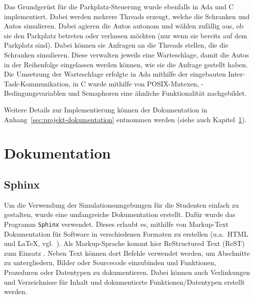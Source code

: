 \documentclass[oneside]{elaboration}
\begin{document}
Das Grundgerüst für die Parkplatz-Steuerung wurde ebenfalls in Ada und C
implementiert. Dabei werden mehrere Threads erzeugt, welche die Schranken und
Autos simulieren. Dabei agieren die Autos autonom und wählen zufällig aus, ob
sie den Parkplatz betreten oder verlassen möchten (nur wenn sie bereits auf dem
Parkplatz sind). Dabei können sie Anfragen an die Threads stellen, die die
Schranken simulieren. Diese verwalten jeweils eine Warteschlage, damit die Autos
in der Reihenfolge eingelassen werden können, wie sie die Anfrage gestellt
haben. Die Umsetzung der Warteschlage erfolgte in Ada mithilfe der eingebauten
Inter-Task-Kommunikation, in C wurde mithilfe von POSIX-Mutexen,
-Bedingungsvariablen und Semaphoren eine ähnliche Funktionalität nachgebildet.

Weitere Details zur Implementierung können der Dokumentation in
Anhang~\ref{sec:projekt-dokumentation} entnommen werden (siehe auch
Kapitel~\ref{sec:dokumentation}).

\section{Dokumentation}
\label{sec:dokumentation}

\subsection{Sphinx}
\label{sec:sphinx}

Um die Verwendung der Simulationsumgebungen für die Studenten einfach zu
gestalten, wurde eine umfangreiche Dokumentation erstellt. Dafür wurde das
Programm \texttt{Sphinx} verwendet. Dieses erlaubt es, mithilfe von Markup-Text
Dokumentation für Software in verschiedenen Formaten zu erstellen (u.a.\ HTML
und LaTeX, vgl.~\cite{Sphinx}). Als Markup-Sprache kommt hier ReStructured Text
(ReST) zum Einsatz \citep[vgl.][]{Sphinx}.
Neben Text können dort Befehle verwendet werden, um Abschnitte zu untergliedern,
Bilder oder Sourcecode einzubinden und Funktionen, Prozeduren oder Datentypen zu
dokumentieren. Dabei können auch Verlinkungen und Verzeichnisse für Inhalt und
dokumentierte Funktionen/Datentypen erstellt werden.
\end{document}
